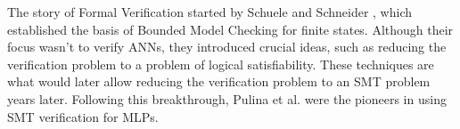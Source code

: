 The story of Formal Verification started by Schuele and Schneider \cite{article_schule_schneider}, which established the basis of Bounded Model Checking for finite states. Although their focus wasn't to verify {ANNs}, they introduced crucial ideas, such as reducing the verification problem to a problem of logical satisfiability. These techniques are what would later allow reducing the verification problem to an SMT problem years later. Following this breakthrough, Pulina et al. \cite{pulinaAbstractionRefinementApproachVerification2010} were the pioneers in using SMT verification for MLPs.

